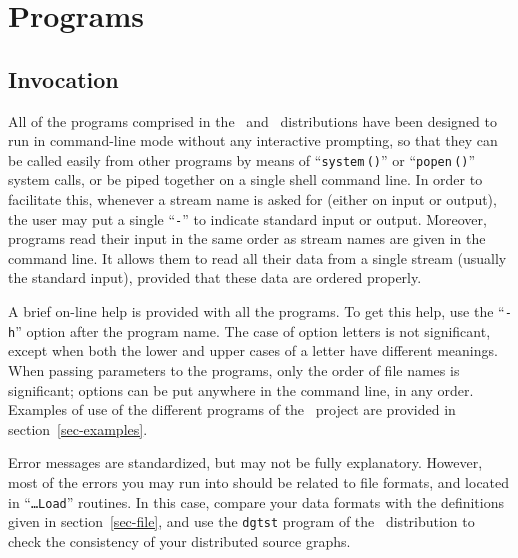 
\section{Programs}
\label{sec-prog}

\subsection{Invocation}

All of the programs comprised in the \scotch\ and
\ptscotch\ distributions have been designed to run in
command-line mode without any interactive prompting,
so that they can be called easily from other programs by means of
``\mbox{\tt system$\,$()}'' or ``\mbox{\tt popen$\,$()}'' system calls, or be
piped together on a single shell command line. In order to facilitate this,
whenever a stream name is asked for (either on input or output), the user may
put a single ``{\tt -}'' to indicate standard input or output.
Moreover, programs read their input in the same order as stream names are
given in the command line. It allows them to read all their data from a
single stream (usually the standard input), provided that these data are
ordered properly.

A brief on-line help is provided with all the programs. To get this
help, use the ``{\tt -h}'' option after the program name. The case of
option letters is not significant, except when both the lower and
upper cases of a letter have different meanings. When passing
parameters to the programs, only the order of file names is
significant; options can be put anywhere in the command line, in any
order. Examples of use of the different programs
of the \ptscotch\ project are provided in section~\ref{sec-examples}.

Error messages are standardized, but may not be fully explanatory.
However, most of the errors you may run into should be related to file
formats, and located in ``\mbox{\tt \ldots Load}'' routines.
In this case, compare your data formats with the definitions
given in section~\ref{sec-file}, and use the {\tt dgtst}
program of the \ptscotch\ distribution to check the consistency of
your distributed source graphs.
\\

